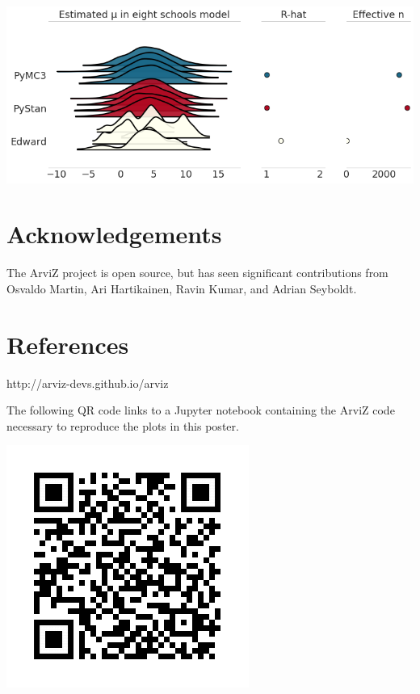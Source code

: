 \documentclass[a0,portrait]{a0poster}
\begin{document}
\begin{multicols}{3}
\begin{center}\vspace{1cm}
\includegraphics[width=1.0\linewidth]{figures/forestplot}
\end{center}



\section{Acknowledgements}

The ArviZ project is open source, but has seen significant contributions from Osvaldo Martin, Ari Hartikainen, Ravin Kumar, and Adrian Seyboldt.

\section{References}
\begin{center}{\color{Green}http://arviz-devs.github.io/arviz}\end{center}

The following QR code links to a Jupyter notebook containing the ArviZ code necessary to reproduce the plots in this poster.


\begin{center}\vspace{1cm}
\includegraphics[width=0.5\linewidth]{figures/qr}
\end{center}


\end{multicols}
\end{document}
